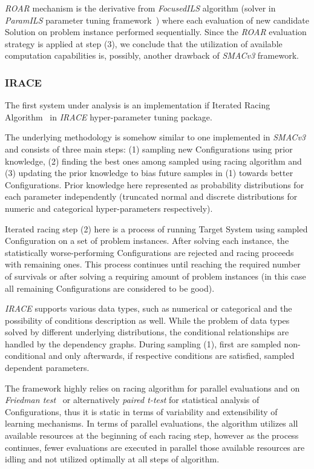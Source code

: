 \textit{ROAR} mechanism is the derivative from \textit{FocusedILS} algorithm (solver in \textit{ParamILS} parameter tuning framework~\cite{hutter2009paramils}) where each evaluation of new candidate Solution on problem instance performed sequentially. Since the \textit{ROAR} evaluation strategy is applied at step (3), we conclude that the utilization of available computation capabilities is, possibly, another drawback of \textit{SMACv3} framework.


\subsubsection{IRACE~\cite{lopez2016irace}}\label{bg: irace}
The first system under analysis is an implementation if Iterated Racing Algorithm~\cite{birattari2010f} in \textit{IRACE} hyper-parameter tuning package.

The underlying methodology is somehow similar to one implemented in \textit{SMACv3} and consists of three main steps: (1) sampling new Configurations using prior knowledge, (2) finding the best ones among sampled using racing algorithm and (3) updating the prior knowledge to bias future samples in (1) towards better Configurations. 
Prior knowledge here represented as probability distributions for each parameter independently (truncated normal and discrete distributions for numeric and categorical hyper-parameters respectively).%

Iterated racing step (2) here is a process of running Target System using sampled Configuration on a set of problem instances. After solving each instance, the statistically worse-performing Configurations are rejected and racing proceeds with remaining ones. This process continues until reaching the required number of survivals or after solving a requiring amount of problem instances (in this case all remaining Configurations are considered to be good). 

\textit{IRACE} supports various data types, such as numerical or categorical and the possibility of conditions description as well. While the problem of data types solved by different underlying distributions, the conditional relationships are handled by the dependency graphs. During sampling (1), first are sampled non-conditional and only afterwards, if respective conditions are satisfied, sampled dependent parameters. 

The framework highly relies on racing algorithm for parallel evaluations and on \textit{Friedman test}~\cite{conover1980practical} or alternatively \textit{paired t-test} for statistical analysis of Configurations, thus it is static in terms of variability and extensibility of learning mechanisms. 
In terms of parallel evaluations, the algorithm utilizes all available resources at the beginning of each racing step, however as the process continues, fewer evaluations are executed in parallel those available resources are idling and not utilized optimally at all steps of algorithm.


